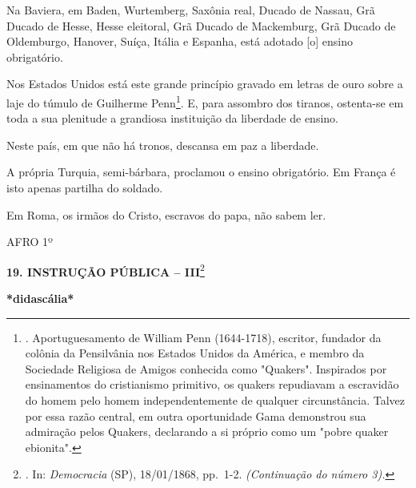Na Baviera, em Baden, Wurtemberg, Saxônia real, Ducado de Nassau, Grã
Ducado de Hesse, Hesse eleitoral, Grã Ducado de Mackemburg, Grã Ducado
de Oldemburgo, Hanover, Suíça, Itália e Espanha, está adotado {[}o{]}
ensino obrigatório.

Nos Estados Unidos está este grande princípio gravado em letras de ouro
sobre a laje do túmulo de Guilherme Penn\footnote{. Aportuguesamento de
  William Penn (1644-1718), escritor, fundador da colônia da Pensilvânia
  nos Estados Unidos da América, e membro da Sociedade Religiosa de
  Amigos conhecida como "Quakers". Inspirados por ensinamentos do
  cristianismo primitivo, os quakers repudiavam a escravidão do homem
  pelo homem independentemente de qualquer circunstância. Talvez por
  essa razão central, em outra oportunidade Gama demonstrou sua
  admiração pelos Quakers, declarando a si próprio como um "pobre quaker
  ebionita".}. E, para assombro dos tiranos, ostenta-se em toda a sua
plenitude a grandiosa instituição da liberdade de ensino.

Neste país, em que não há tronos, descansa em paz a liberdade.

A própria Turquia, semi-bárbara, proclamou o ensino obrigatório. Em
França é isto apenas partilha do soldado.

Em Roma, os irmãos do Cristo, escravos do papa, não sabem ler.

AFRO 1º

\textbf{19. INSTRUÇÃO PÚBLICA -- III}\footnote{. In: \emph{Democracia}
  (SP), 18/01/1868, pp.~1-2. \emph{(Continuação do número 3).}}

\textbf{*didascália*}

